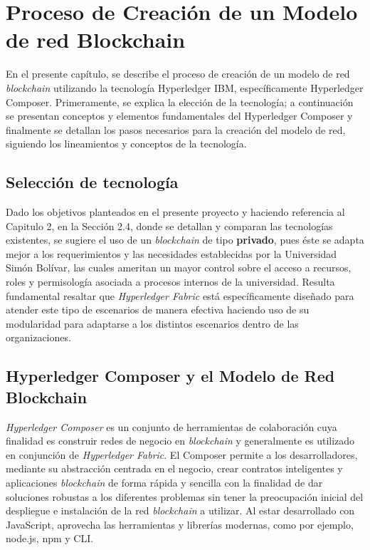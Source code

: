  \graphicspath{ {Figs/Chapter3/} }
 \chapter{Proceso de Creación de un Modelo de red Blockchain}
 
En el presente capítulo, se describe el proceso de creación de un modelo de red \textit{blockchain} utilizando la tecnología Hyperledger IBM, específicamente Hyperledger Composer. Primeramente, se explica la elección de la tecnología; a continuación se presentan conceptos y elementos fundamentales del Hyperledger Composer y finalmente se detallan los pasos necesarios para la creación del modelo de red, siguiendo los lineamientos y conceptos de la tecnología.


\section{Selección de tecnología}
Dado los objetivos planteados en el presente proyecto y haciendo referencia al Capitulo 2, en la Sección 2.4, donde se detallan y comparan las tecnologías existentes, se sugiere el uso  de un \textit{blockchain} de tipo \textbf{privado}, pues éste se adapta mejor a los requerimientos y las necesidades establecidas por la Universidad Simón Bolívar, las cuales ameritan un mayor control sobre el acceso a recursos, roles y permisología asociada a procesos internos de la universidad. Resulta fundamental resaltar que \textit{Hyperledger Fabric} está específicamente diseñado para atender este tipo de escenarios de manera efectiva haciendo uso de su modularidad para adaptarse a los distintos escenarios dentro de las organizaciones. 

\section{Hyperledger Composer y el Modelo de Red Blockchain}

\textit{Hyperledger Composer} es un conjunto de herramientas de colaboración cuya finalidad es construir redes de negocio en \textit{blockchain} y generalmente es utilizado en conjunción de \textit{Hyperledger Fabric}. El Composer permite a los desarrolladores, mediante su abstracción centrada en el negocio, crear contratos inteligentes y aplicaciones \textit{blockchain} de forma rápida y sencilla con la finalidad de dar soluciones robustas a los diferentes problemas sin tener la preocupación inicial del despliegue e instalación de la red \textit{blockchain} a utilizar. Al estar desarrollado con JavaScript, aprovecha las herramientas y librerías modernas, como por ejemplo, node.js, npm y CLI.  

